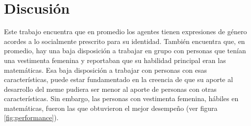 \section{Discusión}
Este trabajo encuentra que en promedio los agentes tienen expresiones de género acordes a lo socialmente prescrito para su identidad. También encuentra que, en promedio, hay una baja disposición a trabajar en grupo con personas que tenían una vestimenta femenina y reportaban que su habilidad principal eran las matemáticas. Esa baja disposición a trabajar con personas con esas características, puede estar fundamentado en la creencia de que su aporte al desarrollo del meme pudiera ser menor al aporte de personas con otras características. Sin embargo, las personas con vestimenta femenina, hábiles en matemáticas, fueron las que obtuvieron el mejor desempeño (ver figura \ref{fig:performance}). 

